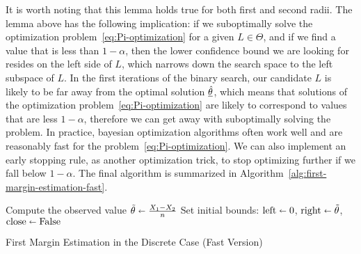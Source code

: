 It is worth noting that this lemma holds true for both first and second radii.
The lemma above has the following implication: if we suboptimally solve the optimization problem~\eqref{eq:Pi-optimization} for a given $L\in\Theta$, and if we find a value that is less than $1-\alpha$, then the lower confidence bound we are looking for resides on the left side of $L$, which narrows down the search space to the left subspace of $L$.
In the first iterations of the binary search, our candidate $L$ is likely to be far away from the optimal solution $\underline{\Hat{\theta}}$, which means that solutions of the optimization problem~\eqref{eq:Pi-optimization} are likely to correspond to values that are less $1-\alpha$, therefore we can get away with suboptimally solving the problem.
In practice, bayesian optimization algorithms often work well and are reasonably fast for the problem~\eqref{eq:Pi-optimization}.
We can also implement an early stopping rule, as another optimization trick, to stop optimizing further if we fall below $1-\alpha$.
The final algorithm is summarized in Algorithm~\ref{alg:first-margin-estimation-fast}.
\begin{algorithm}[htbp]
    \DontPrintSemicolon %
    Compute the observed value $\Tilde{\theta}\shortleftarrow\frac{X_1-X_2}{n}$\;
    Set initial bounds: $\text{left}\shortleftarrow0$, $\text{right}\shortleftarrow\Tilde{\theta}$, $\text{close}\shortleftarrow\text{False}$ \;
    \caption{First Margin Estimation in the Discrete Case (Fast Version)}\label{alg:first-margin-estimation-fast}
\end{algorithm}

